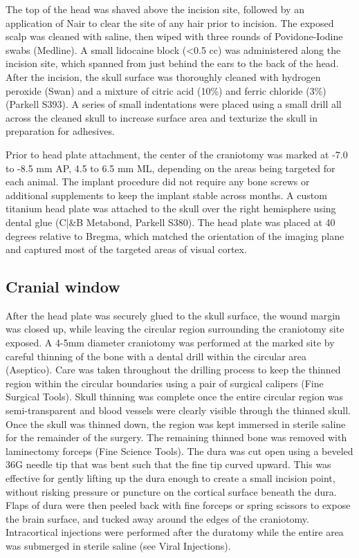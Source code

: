 The top of the head was shaved above the incision site, followed by an application of Nair to clear the site of any hair prior to incision. The exposed scalp was cleaned with saline, then wiped with three rounds of Povidone-Iodine swabs (Medline). A small lidocaine block (<0.5 cc) was administered along the incision site, which spanned from just behind the ears to the back of the head. After the incision, the skull surface was thoroughly cleaned with hydrogen peroxide (Swan) and a mixture of citric acid (10\%) and ferric chloride (3\%) (Parkell S393). A series of small indentations were placed using a small drill all across the cleaned skull to increase surface area and texturize the skull in preparation for adhesives. 

Prior to head plate attachment, the center of the craniotomy was marked at -7.0 to -8.5 mm AP, 4.5 to 6.5 mm ML, depending on the areas being targeted for each animal. The implant procedure did not require any bone screws or additional supplements to keep the implant stable across months. A custom titanium head plate was attached to the skull over the right hemisphere using dental glue (C|\&B Metabond, Parkell S380). The head plate was placed at 40 degrees relative to Bregma, which matched the orientation of the imaging plane and captured most of the targeted areas of visual cortex. 

\subsection{Cranial window}
After the head plate was securely glued to the skull surface, the wound margin was closed up, while leaving the circular region surrounding the craniotomy site exposed. A 4-5mm diameter craniotomy was performed at the marked site by careful thinning of the bone with a dental drill within the circular area (Aseptico). Care was taken throughout the drilling process to keep the thinned region within the circular boundaries using a pair of surgical calipers (Fine Surgical Tools). Skull thinning was complete once the entire circular region was semi-transparent and blood vessels were clearly visible through the thinned skull. Once the skull was thinned down, the region was kept immersed in sterile saline for the remainder of the surgery. The remaining thinned bone was removed with laminectomy forceps (Fine Science Tools). The dura was cut open using a beveled 36G needle tip that was bent such that the fine tip curved upward. This was effective for gently lifting up the dura enough to create a small incision point, without risking pressure or puncture on the cortical surface beneath the dura. Flaps of dura were then peeled back with fine forceps or spring scissors to expose the brain surface, and tucked away around the edges of the craniotomy. Intracortical injections were performed after the duratomy while the entire area was submerged in sterile saline (see Viral Injections).

